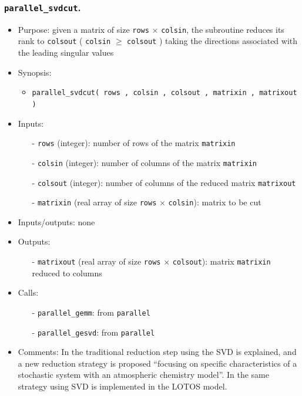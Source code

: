 \documentclass[12pt]{article}
\begin{document}
\subsubsection{{\tt parallel\_svdcut}.}
\begin{itemize}
\item Purpose: given a matrix of size {\tt rows} $\times$ {\tt colsin}, the subroutine reduces its rank to {\tt colsout} ( {\tt colsin} $\geq$ {\tt colsout} ) taking the directions associated with the leading singular values
\item Synopsis: 
\begin{itemize}
\item {\tt parallel\_svdcut( rows , colsin , colsout , matrixin , matrixout )}
\end{itemize}
\item Inputs: 
\begin{itemize}
\item[-] {\tt rows} (integer): number of rows of the matrix {\tt matrixin}
\item[-] {\tt colsin} (integer): number of columns of the matrix {\tt matrixin}
\item[-] {\tt colsout} (integer): number of columns of the reduced matrix {\tt matrixout}
\item[-] {\tt matrixin} (real array of size {\tt rows} $\times$ {\tt colsin}): matrix to be cut
\end{itemize}
\item Inputs/outputs: none
\item Outputs: 
\begin{itemize}
\item[-] {\tt matrixout} (real array of size {\tt rows} $\times$ {\tt colsout}): matrix {\tt matrixin} reduced to  columns
\end{itemize}
\item Calls: 
\begin{itemize}
\item[-] {\tt parallel\_gemm}: from {\tt parallel}
\item[-] {\tt parallel\_gesvd}: from {\tt parallel}
\end{itemize}
\item Comments: In \cite{segersheeminkverlaanvanloon2000} the traditional reduction step using the SVD is explained, and a new reduction strategy is proposed ``focusing on specific characteristics of a stochastic system with an atmospheric chemistry model''. In \cite{vanloonheemink1997} the same strategy using SVD is implemented in the LOTOS model.


\end{itemize}
\end{document}

